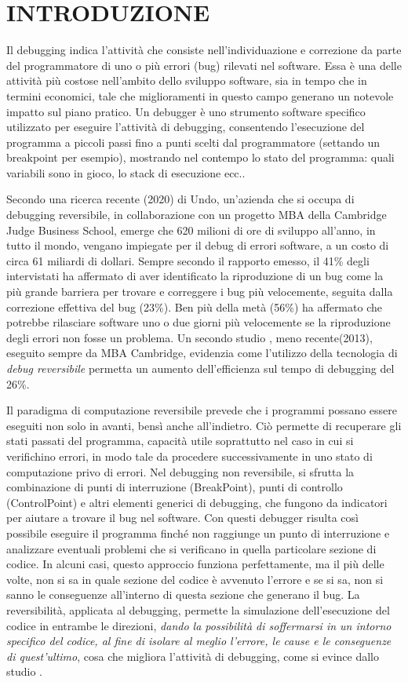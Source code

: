 \documentclass[Tesi.tex]{subfiles}
\begin{document}
\section{INTRODUZIONE}
Il debugging indica l'attività che consiste nell'individuazione e correzione da parte del programmatore di uno o più errori (bug) rilevati nel software.
Essa è una delle attività più costose nell’ambito dello sviluppo software, sia in tempo che in termini economici, tale che miglioramenti in questo campo generano un notevole impatto sul piano pratico.
Un debugger è uno strumento software specifico utilizzato per eseguire l'attività di debugging, consentendo l'esecuzione del programma a piccoli passi fino a punti scelti dal programmatore (settando un breakpoint per esempio), mostrando nel contempo lo stato del programma: quali variabili sono in gioco, lo stack di esecuzione ecc..

Secondo una ricerca recente \cite{devops} (2020) di Undo, un'azienda che si occupa di debugging reversibile, in collaborazione con un progetto MBA della Cambridge Judge Business School, emerge che 620 milioni di ore di sviluppo all'anno, in tutto il mondo, vengano impiegate per il debug di errori software, a un costo di circa 61 miliardi di dollari.
Sempre secondo il rapporto emesso, il 41\% degli intervistati ha affermato di aver identificato la riproduzione di un bug come la più grande barriera per trovare e correggere i bug più velocemente, seguita dalla correzione effettiva del bug (23\%). Ben più della metà (56\%) ha affermato che potrebbe rilasciare software uno o due giorni più velocemente se la riproduzione degli errori non fosse un problema. 
Un secondo studio \cite{MBA}, meno recente(2013), eseguito sempre da MBA Cambridge, evidenzia come l’utilizzo della tecnologia di \textit{debug reversibile} permetta un aumento dell'efficienza sul tempo di debugging del 26\%.

Il paradigma di computazione reversibile prevede che i programmi possano essere eseguiti non solo in avanti, bensì anche all'indietro. Ciò permette di recuperare gli stati passati del programma, capacità utile soprattutto nel caso in cui si verifichino errori, in modo tale da procedere successivamente in uno stato di computazione privo di errori.
Nel debugging non reversibile, si sfrutta la combinazione di punti di interruzione (BreakPoint), punti di controllo (ControlPoint) e altri elementi generici di debugging, che fungono da indicatori per aiutare a trovare il bug nel software. Con questi debugger risulta così possibile eseguire il programma finché non raggiunge un punto di interruzione e analizzare eventuali problemi che si verificano in  quella particolare sezione di codice. In alcuni casi, questo approccio funziona perfettamente, ma il più delle volte, non si sa in quale sezione del codice è avvenuto l'errore e se si sa, non si sanno le conseguenze all'interno di questa sezione che generano il bug.
La reversibilità, applicata al debugging, permette la simulazione dell'esecuzione del codice in entrambe le direzioni, \textit{dando la possibilità di soffermarsi in un intorno specifico del codice, al fine di isolare al meglio l'errore, le cause e le conseguenze di quest'ultimo}, cosa che migliora l'attività di debugging, come si evince dallo studio \cite{MBA}.
\end{document}
